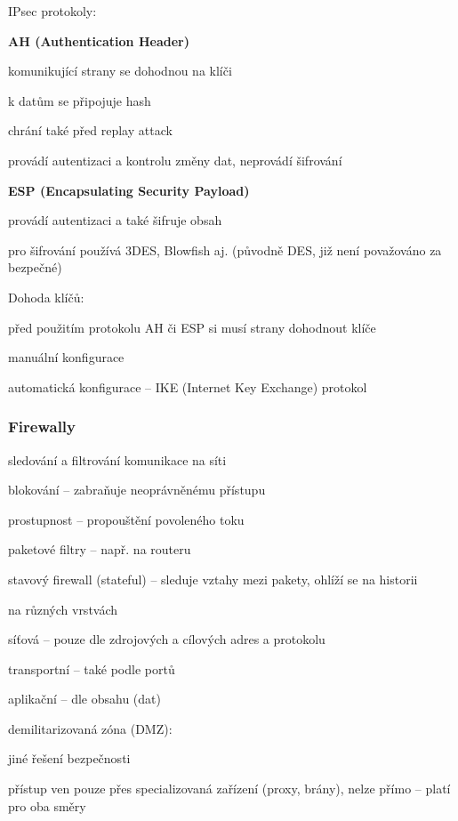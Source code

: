 IPsec protokoly:
\begin{pitemize}
	\item \textbf{AH (Authentication Header)}
	\begin{pitemize}
		\item komunikující strany se dohodnou na klíči
		\item k datům se připojuje hash
		\item chrání také před replay attack
		\item provádí autentizaci a kontrolu změny dat, neprovádí šifrování 
	\end{pitemize}
	\item \textbf{ESP (Encapsulating Security Payload)}
	\begin{pitemize}
		\item provádí autentizaci a také šifruje obsah
		\item pro šifrování používá 3DES, Blowfish aj. (původně DES, již není považováno za bezpečné) 
	\end{pitemize}
\end{pitemize}

Dohoda klíčů:
\begin{pitemize}
	\item před použitím protokolu AH či ESP si musí strany dohodnout klíče
	\item manuální konfigurace
	\item automatická konfigurace -- IKE (Internet Key Exchange) protokol 
\end{pitemize}

\subsubsection*{Firewally}
\begin{pitemize}
	\item sledování a filtrování komunikace na síti
	\begin{pitemize}
		\item blokování -- zabraňuje neoprávněnému přístupu
		\item prostupnost -- propouštění povoleného toku 
	\end{pitemize}
	\item paketové filtry -- např. na routeru
	\item stavový firewall (stateful) -- sleduje vztahy mezi pakety, ohlíží se na historii
	\item na různých vrstvách
	\begin{pitemize}
		\item síťová -- pouze dle zdrojových a cílových adres a protokolu
		\item transportní -- také podle portů
		\item aplikační -- dle obsahu (dat) 
	\end{pitemize}
	\item demilitarizovaná zóna (DMZ):
	\begin{pitemize}
		\item jiné řešení bezpečnosti
		\item přístup ven pouze přes specializovaná zařízení (proxy, brány), nelze přímo -- platí pro oba směry 
	\end{pitemize}
\end{pitemize}
